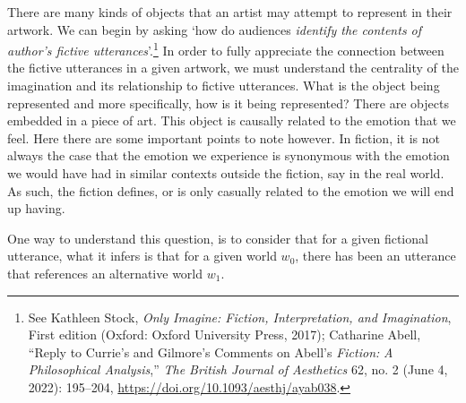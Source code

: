 \documentclass[phdthesis,12pt,final]{wuthesis}
\theoremstyle{definition}
\theoremstyle{definition}
\theoremstyle{definition}
\theoremstyle{definition}
\theoremstyle{remark}
\begin{document}
There are many kinds of objects that an artist may attempt to represent in their artwork. We can begin by asking `how do audiences \emph{identify the contents of author's fictive utterances}'.\footnote{See Kathleen Stock, \emph{Only Imagine: Fiction, Interpretation, and Imagination}, First edition (Oxford: Oxford University Press, 2017); Catharine Abell, {``Reply to {Currie}'s and {Gilmore}'s Comments on {Abell}'s {\emph{Fiction}}{\emph{:} }{\emph{A Philosophical Analysis}},''} \emph{The British Journal of Aesthetics} 62, no. 2 (June 4, 2022): 195--204, \url{https://doi.org/10.1093/aesthj/ayab038}.} In order to fully appreciate the connection between the fictive utterances in a given artwork, we must understand the centrality of the imagination and its relationship to fictive utterances. What is the object being represented and more specifically, how is it being represented? There are objects embedded in a piece of art. This object is causally related to the emotion that we feel. Here there are some important points to note however. In fiction, it is not always the case that the emotion we experience is synonymous with the emotion we would have had in similar contexts outside the fiction, say in the real world. As such, the fiction defines, or is only casually related to the emotion we will end up having.


One way to understand this question, is to consider that for a given fictional utterance, what it infers is that for a given world \(w_0\), there has been an utterance that references an alternative world \(w_1\).
\end{document}
